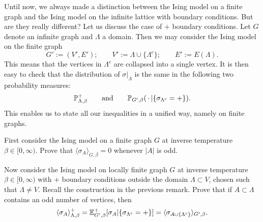 \begin{remark}
    Until now, we always made a distinction between the Ising model on a finite graph
    and the Ising model on the infinite lattice with boundary conditions.
    But are they really different?
    Let us discuss the case of $+$ boundary conditions.
    Let $G$ denote an infinite graph and $\Lambda$ a domain.
    Then we may consider the Ising model on the finite graph
    \[
        G':=(V',E');
        \qquad
        V':=\Lambda\cup \{\Lambda^c\};
        \qquad
        E':=E(\Lambda).
    \]
    This means that the vertices in $\Lambda^c$ are collapsed
    into a single vertex.
    It is then easy to check that
    the distribution of $\sigma|_{\Lambda}$ is the same in the following two probability measures:
    \[
        \P^+_{\Lambda,\beta}
        \qquad
        \text{and}
        \qquad
        \P_{G',\beta}(\blank|\{\sigma_{\Lambda^c}=+\}).
    \]
    This enables us to state all our inequalities in a unified way,
    namely on finite graphs.
\end{remark}

\begin{exercise}
    First consider the Ising model on a finite graph $G$ at inverse temperature
    $\beta\in[0,\infty)$.
    Prove that $\langle\sigma_A\rangle_{G,\beta}=0$
    whenever $|A|$ is odd.

    Now consider the Ising model on locally finite graph $G$ at inverse temperature
    $\beta\in[0,\infty)$ with $+$ boundary conditions outside the domain
    $\Lambda\subset V$, chosen such that $\Lambda\neq V$.
    Recall the construction in the previous remark.
    Prove that if $A\subset\Lambda$ contains an odd number of vertices,
    then
    \[
        \langle\sigma_A\rangle_{\Lambda,\beta}^+
        =
        \mathbb E_{G',\beta}^+[\sigma_A|\{\sigma_{\Lambda^c}=+\}]
        =
        \langle\sigma_{A\cup\{\Lambda^c\}}\rangle_{G',\beta}.
    \]
\end{exercise}
